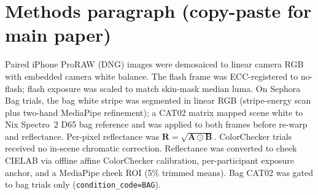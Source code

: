 \documentclass[11pt]{article}
\begin{document}
\section*{Methods paragraph (copy-paste for main paper)}
\small
Paired iPhone ProRAW (DNG) images were demosaiced to linear camera RGB with embedded camera white balance. The flash frame was ECC-registered to no-flash; flash exposure was scaled to match skin-mask median luma. On Sephora Bag trials, the bag white stripe was segmented in linear RGB (stripe-energy scan plus two-hand MediaPipe refinement); a CAT02 matrix mapped scene white to Nix Spectro~2 D65 bag reference and was applied to both frames before re-warp and reflectance. Per-pixel reflectance was $\mathbf{R}=\sqrt{\mathbf{A}\odot\mathbf{B}}$. ColorChecker trials received no in-scene chromatic correction. Reflectance was converted to cheek CIELAB via offline affine ColorChecker calibration, per-participant exposure anchor, and a MediaPipe cheek ROI (5\% trimmed means). Bag CAT02 was gated to bag trials only (\texttt{condition\_code=BAG}).
\end{document}
